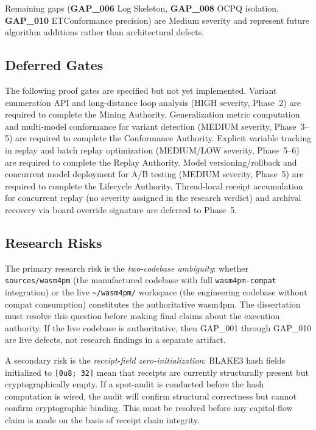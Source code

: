 Remaining gaps (\textbf{GAP\_006} Log Skeleton, \textbf{GAP\_008} OCPQ isolation,
\textbf{GAP\_010} ETConformance precision) are Medium severity and represent future algorithm
additions rather than architectural defects.

\subsection{Deferred Gates}
\label{sec:sources-wasm4pm-gaps-deferred}

The following proof gates are specified but not yet implemented. Variant enumeration API and
long-distance loop analysis (HIGH severity, Phase~2) are required to complete the Mining
Authority. Generalization metric computation and multi-model conformance for variant detection
(MEDIUM severity, Phase~3--5) are required to complete the Conformance Authority. Explicit
variable tracking in replay and batch replay optimization (MEDIUM/LOW severity, Phase~5--6) are
required to complete the Replay Authority. Model versioning/rollback and concurrent model
deployment for A/B testing (MEDIUM severity, Phase~5) are required to complete the Lifecycle
Authority. Thread-local receipt accumulation for concurrent replay (no severity assigned in the
research verdict) and archival recovery via board override signature are deferred to Phase~5.

\subsection{Research Risks}
\label{sec:sources-wasm4pm-gaps-risks}

The primary research risk is the \emph{two-codebase ambiguity}: whether \texttt{sources/wasm4pm}
(the manufactured codebase with full \texttt{wasm4pm-compat} integration) or the live
\texttt{\textasciitilde/wasm4pm/} workspace (the engineering codebase without compat consumption)
constitutes the authoritative wasm4pm. The dissertation must resolve this question before making
final claims about the execution authority. If the live codebase is authoritative, then GAP\_001
through GAP\_010 are live defects, not research findings in a separate artifact.

A secondary risk is the \emph{receipt-field zero-initialization}: BLAKE3 hash fields initialized
to \texttt{[0u8;~32]} mean that receipts are currently structurally present but cryptographically
empty. If a spot-audit is conducted before the hash computation is wired, the audit will confirm
structural correctness but cannot confirm cryptographic binding. This must be resolved before any
capital-flow claim is made on the basis of receipt chain integrity.

